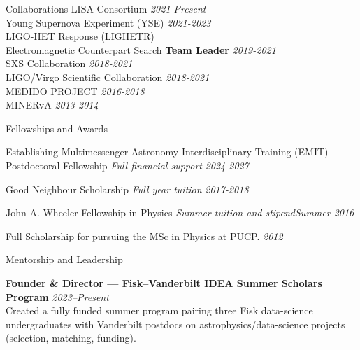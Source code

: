 \documentclass{resume}
\begin{document}
\newpage

\begin{rSection}{Collaborations}\vspace{0.4cm}         
 LISA Consortium \hfill {\em 2021-Present}\\
 Young Supernova Experiment (YSE) \hfill {\em 2021-2023}\\
 LIGO-HET Response (LIGHETR)\\ 
 Electromagnetic Counterpart Search \textbf{Team Leader} \hfill {\em 2019-2021}\\
 SXS Collaboration \hfill {\em 2018-2021}\\
 LIGO/Virgo Scientific Collaboration \hfill {\em 2018-2021}\\
 MEDIDO PROJECT \hfill {\em 2016-2018}\\
 MINERvA \hfill {\em 2013-2014}
\end{rSection}



\begin{rSection}{Fellowships and Awards}
\item Establishing Multimessenger Astronomy Interdisciplinary Training (EMIT) \\Postdoctoral Fellowship \textit{Full financial support} \hfill{\em2024-2027}
\item Good Neighbour Scholarship \textit{Full year tuition} \hfill{\em2017-2018}
\item John A. Wheeler Fellowship in Physics \textit{Summer tuition and stipend}\hfill{\em Summer 2016}
\item Full Scholarship for pursuing the MSc in Physics at PUCP. \hfill{\em2012 }
\end{rSection}

\begin{rSection}{Mentorship and Leadership}


{\bf Founder \& Director — Fisk–Vanderbilt IDEA Summer Scholars Program} \hfill {\em 2023--Present}\\
Created a fully funded summer program pairing three Fisk data-science undergraduates with Vanderbilt postdocs on astrophysics/data-science projects (selection, matching, funding).
\end{rSection}
\end{document}
